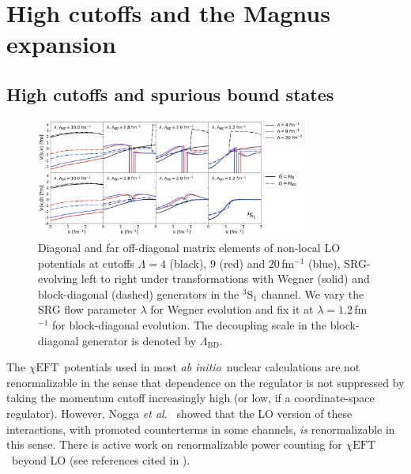 \documentclass[10pt,aps,prc,floatfix,twocolumn,nofootinbib]{revtex4-1}
\newcommand{\chiEFT}{\ensuremath{\chi{\textrm{EFT}}}}
\newcommand{\LambdaBD}{{\Lambda_{\text{BD}}}}
\newcommand{\abi}{\textit{ab initio}}
\begin{document}
\section{High cutoffs and the Magnus expansion}
\label{sec:high_cutoffs_magnus_exp}


\subsection{High cutoffs and spurious bound states}
\label{sec:high_cutoffs}

%
\begin{figure}[tbh]
    \includegraphics[clip,width=0.8\textwidth]{potential_slices_3S1_kvnns_900_901_902.pdf}
	\caption{Diagonal and far off-diagonal matrix elements of non-local LO potentials at cutoffs $\Lambda=4$ (black), $9$ (red) and $20$\,fm$^{-1}$ (blue), SRG-evolving left to right under transformations with Wegner (solid) and block-diagonal (dashed) generators in the $^3$S$_1$ channel.
	We vary the SRG flow parameter $\lambda$ for Wegner evolution and fix it at $\lambda=1.2$\,fm$^{-1}$ for block-diagonal evolution. The decoupling scale in the block-diagonal generator is denoted by $\LambdaBD$.}
	\label{fig:potential_slices_high_cutoffs}
\end{figure}
%

The \chiEFT\ potentials used in most \abi\ nuclear calculations are not renormalizable in the sense that dependence on the regulator is not suppressed by taking the momentum cutoff increasingly high (or low, if a coordinate-space regulator).
However, Nogga \textit{et al.}~\cite{Nogga:2005hy} showed that the LO version of these interactions, with promoted counterterms in some channels, \emph{is} renormalizable in this sense.
There is active work on renormalizable power counting for \chiEFT\ beyond LO (see references cited in \cite{Tews:2018sbi}). 
\end{document}
